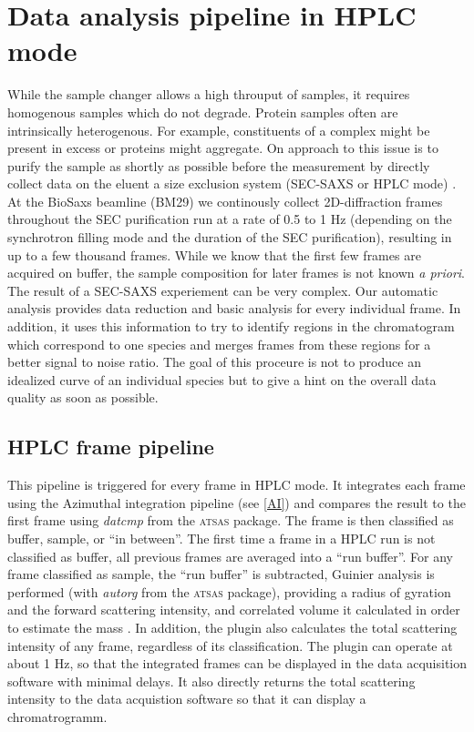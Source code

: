 \documentclass[preprint,pdf]{iucr}              %
\begin{document}
\section{Data analysis pipeline in HPLC mode}
While the sample changer allows a high throuput of samples, it requires
homogenous samples which do not degrade. 
Protein samples often are intrinsically heterogenous. 
For example, constituents of a complex might be present in excess or proteins
might aggregate.  
On approach to this issue is to purify the sample as shortly as possible before 
the measurement by directly collect data on the eluent a size exclusion system 
(SEC-SAXS or HPLC mode) \cite{SECPaper2012, otherSEC}. 
At the BioSaxs beamline (BM29) we continously collect 2D-diffraction frames
throughout the SEC purification run at a rate of 0.5 to 1 Hz 
(depending on the synchrotron filling mode and the duration of the SEC purification), 
resulting in up to a few thousand frames. 
While we know that the first few frames are acquired on buffer, the sample composition 
for later frames is not known \textit{a priori}. 
The result of a SEC-SAXS experiement can be very complex. 
Our automatic analysis provides data reduction and basic analysis for every
individual frame. 
In addition, it uses this information to try to identify regions in the
chromatogram which correspond to one species and merges frames from these
regions for a better signal to noise ratio. 
The goal of this proceure is not to produce an idealized curve of an individual
species but to give a hint on the overall data quality as soon as possible.

\subsection{HPLC frame pipeline}

This pipeline is triggered for every frame in HPLC mode. 
It integrates each frame using the Azimuthal integration pipeline (see \ref{AI})
and compares the result to the first frame using \textit{datcmp} from the
\textsc{atsas} package. 
The frame is then classified as buffer, sample, or ``in between''. 
The first time a frame in a HPLC run is not classified as buffer, all previous
frames are averaged into a ``run buffer''. 
For any frame classified as sample, the ``run buffer'' is subtracted, Guinier
analysis is performed (with \textit{autorg} from the \textsc{atsas} package), 
providing a radius of gyration and the forward scattering intensity, and
correlated volume it calculated in order to estimate the mass
\cite{RamboTainerNature2013}. 
In addition, the plugin also calculates the total scattering intensity of any
frame, regardless of its classification.
The plugin can operate at about 1 Hz, so that the integrated frames can be
displayed in the data acquisition software with minimal delays. 
It also directly returns the total scattering intensity to the data acquistion
software so that it can display a chromatrogramm. 
\end{document}
